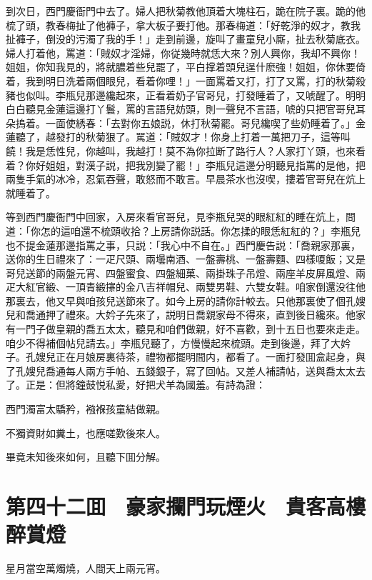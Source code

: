 到次日，西門慶衙門中去了。婦人把秋菊教他頂着大塊柱石，跪在院子裏。跪的他梳了頭，教春梅扯了他褲子，拿大板子要打他。那春梅道：「好乾淨的奴才，教我扯褲子，倒没的污濁了我的手！」走到前邊，旋叫了畫童兒小廝，扯去秋菊底衣。婦人打着他，罵道：「賊奴才淫婦，你従幾時就恁大來？別人興你，我却不興你！姐姐，你知我見的，將就膿着些兒罷了，平白撑着頭兒逞什麽強！姐姐，你休要倚着，我到明日洗着兩個眼兒，看着你哩！」一面罵着又打，打了又罵，打的秋菊殺豬也似叫。李瓶兒那邊纔起來，正看着奶子官哥兒，打發睡着了，又唬醒了。明明白白聽見金蓮這邊打丫鬟，罵的言語兒妨頭，則一聲兒不言語，唬的只把官哥兒耳朵摀着。一面使綉春：「去對你五娘説，休打秋菊罷。哥兒纔喫了些奶睡着了。」金蓮聽了，越發打的秋菊狠了。駡道：「賊奴才！你身上打着一萬把刀子，這等叫饒！我是恁性兒，你越叫，我越打！莫不為你拉断了路行人？人家打丫頭，也來看着？你好姐姐，對漢子説，把我別變了罷！」李瓶兒這邊分明聽見指罵的是他，把兩隻手氣的冰冷，忍氣吞聲，敢怒而不敢言。早晨茶水也沒喫，摟着官哥兒在炕上就睡着了。

等到西門慶衙門中回家，入房來看官哥兒，見李瓶兒哭的眼紅紅的睡在炕上，問道：「你怎的這咱還不梳頭收拾？上房請你説話。你怎揉的眼恁紅紅的？」李瓶兒也不提金蓮那邊指罵之事，只説：「我心中不自在。」西門慶告説：「喬親家那裏，送你的生日禮來了：一疋尺頭、兩壜南酒、一盤壽桃、一盤壽麵、四樣嗄飯；又是哥兒送節的兩盤元宵、四盤蜜食、四盤細菓、兩掛珠子吊燈、兩座羊皮屏風燈、兩疋大紅官緞、一頂青緞㩟的金八吉祥帽兒、兩雙男鞋、六雙女鞋。咱家倒還没往他那裏去，他又早與咱孩兒送節來了。如今上房的請你計較去。只他那裏使了個孔嫂兒和喬通押了禮來。大妗子先來了，説明日喬親家母不得來，直到後日纔來。他家有一門子做皇親的喬五太太，聽見和咱們做親，好不喜歡，到十五日也要來走走。咱少不得補個帖兒請去。」李瓶兒聽了，方慢慢起來梳頭。走到後邊，拜了大妗子。孔嫂兒正在月娘房裏待茶，禮物都擺明間内，都看了。一面打發囬盒起身，與了孔嫂兒喬通每人兩方手帕、五錢銀子，寫了回帖。又差人補請帖，送與喬太太去了。正是：但將鐘鼓悦私愛，好把犬羊為國羞。有詩為證：

西門濁富太驕矜，襁褓孩童結做親。

不獨資財如糞土，也應嗟歎後來人。

畢竟未知後來如何，且聽下囬分解。

\chapter*{第四十二囬　豪家攔門玩煙火　貴客高樓醉賞燈}

星月當空萬燭燒，人間天上兩元宵。

